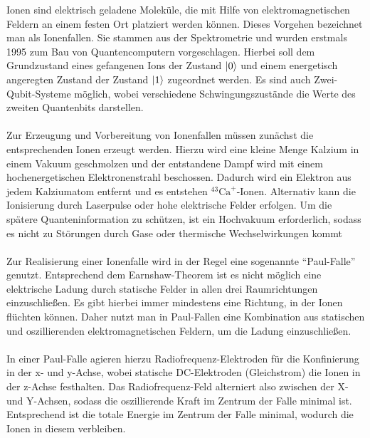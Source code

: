 Ionen sind elektrisch geladene Moleküle, die mit Hilfe von elektromagnetischen Feldern an einem festen Ort platziert werden können. Dieses Vorgehen bezeichnet man als Ionenfallen. Sie stammen aus der Spektrometrie und wurden erstmals 1995 zum Bau von Quantencomputern vorgeschlagen. Hierbei soll dem Grundzustand eines gefangenen Ions der Zustand $\ket0$ und einem energetisch angeregten Zustand der Zustand $\ket1$ zugeordnet werden. Es sind auch Zwei-Qubit-Systeme möglich, wobei verschiedene Schwingungszustände die Werte des zweiten Quantenbits darstellen. 
\cite{homeister_quantum_2022-1}
\\
\\
Zur Erzeugung und Vorbereitung von Ionenfallen müssen zunächst die entsprechenden Ionen erzeugt werden. Hierzu wird eine kleine Menge Kalzium in einem Vakuum geschmolzen und der entstandene Dampf wird mit einem hochenergetischen Elektronenstrahl beschossen. Dadurch wird ein Elektron aus jedem Kalziumatom entfernt und es entstehen ${}^{43}\mathrm{Ca}^+$-Ionen. 
\cite{kasirajan_fundamentals_2021} %
Alternativ kann die Ionisierung durch Laserpulse oder hohe elektrische Felder erfolgen. \cite{lapierre_getting_2022} %
Um die spätere Quanteninformation zu schützen, ist ein Hochvakuum erforderlich, sodass es nicht zu Störungen durch Gase oder thermische Wechselwirkungen kommt \cite{kasirajan_fundamentals_2021}
\\
\\
Zur Realisierung einer Ionenfalle wird in der Regel eine sogenannte ``Paul-Falle'' genutzt. Entsprechend dem Earnshaw-Theorem ist es nicht möglich eine elektrische Ladung durch statische Felder in allen drei Raumrichtungen einzuschließen. Es gibt hierbei immer mindestens eine Richtung, in der Ionen flüchten können. Daher nutzt man in Paul-Fallen eine Kombination aus statischen und oszillierenden elektromagnetischen Feldern, um die Ladung einzuschließen. \cite{lapierre_getting_2022} %
\\ \\
In einer Paul-Falle agieren hierzu Radiofrequenz-Elektroden für die Konfinierung in der x- und y-Achse, wobei statische DC-Elektroden (Gleichstrom) die Ionen in der z-Achse festhalten. Das Radiofrequenz-Feld alterniert also zwischen der X- und Y-Achsen, sodass die oszillierende Kraft im Zentrum der Falle minimal ist. Entsprechend ist die totale Energie im Zentrum der Falle minimal, wodurch die Ionen in diesem verbleiben. \cite{kasirajan_fundamentals_2021} \\
